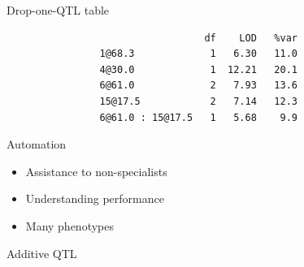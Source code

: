 \documentclass[12pt]{article}
\newcommand{\headsize}{\fontsize{35}{35} \selectfont}
\newcommand{\smallersize}{\fontsize{20}{25} \selectfont}
\begin{document}
\newpage

\headsize \color{myyellow}
\hfill \begin{minipage}{5.75in}
\centering
Drop-one-QTL table
\end{minipage}


\vspace{40mm}

\color{mywhite} \smallersize

\begin{verbatim}
                                  df    LOD   %var
                1@68.3             1   6.30   11.0
                4@30.0             1  12.21   20.1
                6@61.0             2   7.93   13.6
                15@17.5            2   7.14   12.3
                6@61.0 : 15@17.5   1   5.68    9.9
\end{verbatim}




\newpage

\headsize \color{myyellow}
\hfill \begin{minipage}{5.75in}
\centering
Automation
\end{minipage}

\vspace{3cm} \color{mywhite} \smallersize

\hfill \begin{minipage}{10in}
\begin{itemize}
\itemsep24pt

\item Assistance to non-specialists

\item Understanding performance

\item Many phenotypes

\end{itemize}
\end{minipage}


\newpage


\headsize \color{myyellow}
\hfill \begin{minipage}{5.75in}
\centering
Additive QTL
\end{minipage}

\vspace{2cm} \color{mywhite} \smallersize
\end{document}
